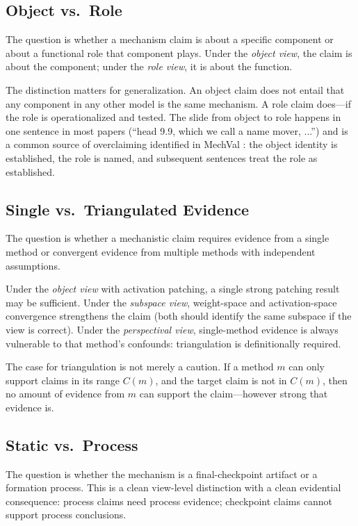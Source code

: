 \documentclass[11pt]{article}
\theoremstyle{remark}
\begin{document}
\subsection{Object vs.\ Role}

The question is whether a mechanism claim is about a specific component
or about a functional role that component plays.  Under the \emph{object
view}, the claim is about the component; under the \emph{role view},
it is about the function.

The distinction matters for generalization.  An object claim does not
entail that any component in any other model is the same mechanism.  A
role claim does---if the role is operationalized and tested.  The slide
from object to role happens in one sentence in most papers (``head 9.9,
which we call a name mover, ...'') and is a common source of overclaiming
identified in MechVal \citep{tower2026mechval}: the object identity is
established, the role is named, and subsequent sentences treat the role
as established.

\subsection{Single vs.\ Triangulated Evidence}

The question is whether a mechanistic claim requires evidence from a
single method or convergent evidence from multiple methods with
independent assumptions.

Under the \emph{object view} with activation patching, a single strong
patching result may be sufficient.  Under the \emph{subspace view},
weight-space and activation-space convergence strengthens the claim
(both should identify the same subspace if the view is correct).
Under the \emph{perspectival view}, single-method evidence is always
vulnerable to that method's confounds: triangulation is definitionally
required.

The case for triangulation is not merely a caution.  If a method $m$
can only support claims in its range $C(m)$, and the target claim is
not in $C(m)$, then no amount of evidence from $m$ can support the
claim---however strong that evidence is.

\subsection{Static vs.\ Process}

The question is whether the mechanism is a final-checkpoint artifact
or a formation process.  This is a clean view-level distinction with
a clean evidential consequence: process claims need process evidence;
checkpoint claims cannot support process conclusions.
\end{document}
